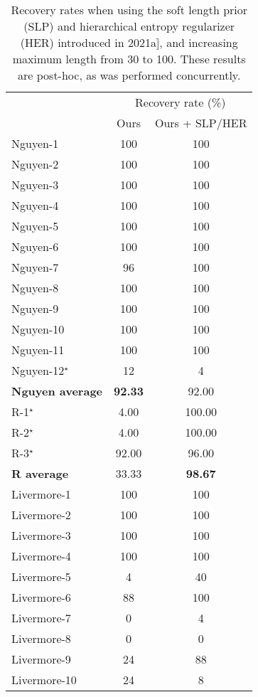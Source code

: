 \documentclass{article}
\begin{document}
\begin{table}[htbp]
  \centering
  \caption{
  Recovery rates when using the soft length prior (SLP) and hierarchical entropy regularizer (HER) introduced in \citet{larma2021improving}2021a], and increasing maximum length from 30 to 100.
  These results are post-hoc, as \citet{larma2021improving} was performed concurrently.}
    \begin{tabular}{lcc}
          & \multicolumn{2}{c}{Recovery rate (\%)}  \\
          & Ours & Ours + SLP/HER \\
\cmidrule{2-3}    Nguyen-1 & 100 & 100 \\
    Nguyen-2 & 100 & 100 \\
    Nguyen-3 & 100 & 100 \\
    Nguyen-4 & 100 & 100 \\
    Nguyen-5 & 100 & 100 \\
    Nguyen-6 & 100 & 100 \\
    Nguyen-7 & 96 & 100 \\
    Nguyen-8 & 100 & 100 \\
    Nguyen-9 & 100 & 100 \\
    Nguyen-10 & 100 & 100 \\
    Nguyen-11 & 100 & 100 \\
    Nguyen-12$^\star$ & 12 & 4 \\
    \midrule
    \textbf{Nguyen average} & \textbf{92.33} & 92.00 \\
    \midrule
    R-1$^\star$  & 4.00  & 100.00 \\
    R-2$^\star$  & 4.00  & 100.00 \\
    R-3$^\star$  & 92.00 & 96.00 \\
    \midrule
    \textbf{R average} & 33.33 & \textbf{98.67} \\
    \midrule
    Livermore-1 & 100 & 100 \\
    Livermore-2 & 100 & 100 \\
    Livermore-3 & 100 & 100 \\
    Livermore-4 & 100 & 100 \\
    Livermore-5 & 4  & 40 \\
    Livermore-6 & 88 & 100 \\
    Livermore-7 & 0  & 4 \\
    Livermore-8 & 0  & 0 \\
    Livermore-9 & 24 & 88 \\
    Livermore-10 & 24 & 8 \\

\end{tabular}
\end{table}
\end{document}
